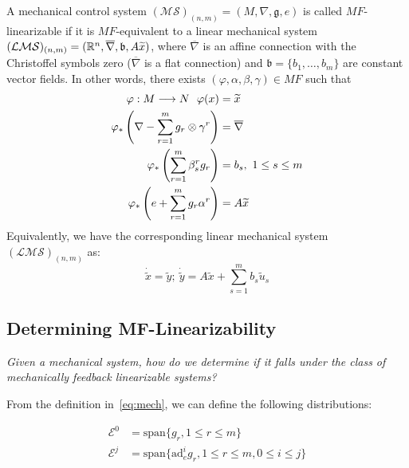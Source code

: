 \begin{defn}
    A mechanical control system $(\mathcal{MS})_{(n,m)} = (M, \nabla, \mathfrak{g}, e)$ is called $MF$-linearizable if it is $MF$-equivalent to a linear mechanical system $(\mathcal{LMS})_{(n,m)} = (\R[n], \overline{\nabla}, \mathfrak{b}, A \widetilde{x})$, where $\overline{\nabla}$ is an affine connection with the Christoffel symbols zero ($\overline{\nabla}$ is a flat connection) and $\mathfrak{b} = \{b_1, \dots, b_m \}$ are constant vector fields. In other words, there exists $(\varphi, \alpha, \beta, \gamma) \in MF$ such that 
    \begin{equation}
        \begin{split}
            \varphi: M \lra N \ \ \varphi(x)  &= \widetilde{x} \\
            \varphi_*\left(\nabla - \sum_{r=1}^m g_r \otimes \gamma^r\right) &= \overline{\nabla} \\
            \varphi_*\left( \sum_{r=1}^m \beta^r_s g_r \right) &= b_s, \ 1 \leq s \leq m \\
            \varphi_* \left( e + \sum_{r=1}^m g_r \alpha^r \right) &= A \widetilde{x}
        \end{split}
    \end{equation}
    Equivalently, we have the corresponding linear mechanical system $(\mathcal{LMS})_{(n,m)}$ as:
    \begin{equation}\label{sode-lin}
            \dot{\tilde{x}}  = \tilde{y}; \ 
            \dot{\tilde{y}}  = A \tilde{x} + \sum_{s=1}^m b_s \tilde{u}_s
    \end{equation}
\end{defn}


\subsection{Determining MF-Linearizability}

\textsl{Given a mechanical system, how do we determine if it falls under the class of mechanically feedback linearizable systems?}

From the definition in~\eqref{eq:mech}, we can define the following distributions:

\begin{equation}
    \begin{split}
        \mathcal{E}^0 & = \text{span} \{ g_r, 1 \leq r \leq m \} \\
        \mathcal{E}^j & = \text{span} \{ \text{ad}^i_e g_r, 1 \leq r \leq m, 0 \leq i \leq j \}
    \end{split}
\end{equation}

